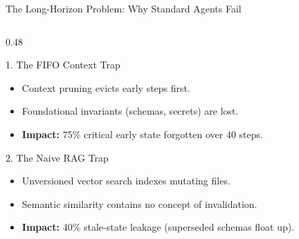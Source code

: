 \documentclass[aspectratio=169,10pt]{beamer}
\begin{document}
\begin{frame}{The Long-Horizon Problem: Why Standard Agents Fail}
  \begin{columns}[T,onlytextwidth]
    \begin{column}{0.48\textwidth}
      \begin{block}{1. The FIFO Context Trap}
        \begin{itemize}
          \item Context pruning evicts early steps first.
          \item Foundational invariants (schemas, secrets) are lost.
          \item \textbf{Impact:} 75\% critical early state forgotten over 40 steps.
        \end{itemize}
      \end{block}
      \vspace{0.3em}
      \begin{block}{2. The Naive RAG Trap}
        \begin{itemize}
          \item Unversioned vector search indexes mutating files.
          \item Semantic similarity contains no concept of invalidation.
          \item \textbf{Impact:} 40\% stale-state leakage (superseded schemas float up).
        \end{itemize}
      \end{block}
    \end{column}


\end{columns}
\end{frame}
\end{document}
